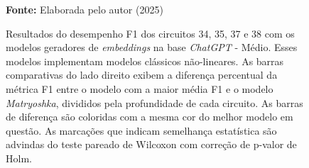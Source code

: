 \begin{figure}
\caption{Resultados do desempenho F1 dos circuitos 34, 35, 37 e 38 com os modelos geradores de \textit{embeddings} na base \textit{ChatGPT} - Médio. Esses modelos implementam modelos clássicos não-lineares. As barras comparativas do lado direito exibem a diferença percentual da métrica F1 entre o modelo com a maior média F1 e o modelo \textit{Matryoshka}, divididos pela profundidade de cada circuito. As barras de diferença são coloridas com a mesma cor do melhor modelo em questão. As marcações que indicam semelhança estatística são advindas do teste pareado de Wilcoxon com correção de p-valor de Holm.}
\label{fig:model_transformer:medium:g5}
     \centering
    \centering

      \par\medskip\ABNTEXfontereduzida\selectfont\textbf{Fonte:} Elaborada pelo autor (2025) \par\medskip
\end{figure}